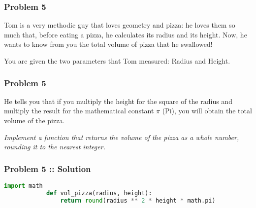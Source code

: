 \documentclass[14pt]{beamer}
\begin{document}
    \begin{frame}
        \frametitle{Problem 5}
        Tom is a very methodic guy that loves geometry and pizza: he loves them so much that, before eating a pizza, he calculates its radius and its height. Now, he wants to know from you the total volume of pizza that he swallowed!

        You are given the two parameters that Tom measured: Radius and Height.
    \end{frame}
    \begin{frame}
        \frametitle{Problem 5}
        He tells you that if you multiply the height for the square of the radius and multiply the result for the mathematical constant $\pi$ (Pi), you will obtain the total volume of the pizza. 
        
        \emph{Implement a function that returns the volume of the pizza as a whole number, rounding it to the nearest integer.}
    \end{frame}
    \begin{frame}[containsverbatim]
        \frametitle{Problem 5 :: Solution}
        \begin{lstlisting}[language=Python]
            import math
            def vol_pizza(radius, height):
                return round(radius ** 2 * height * math.pi)
        \end{lstlisting}
    \end{frame}
\end{document}
